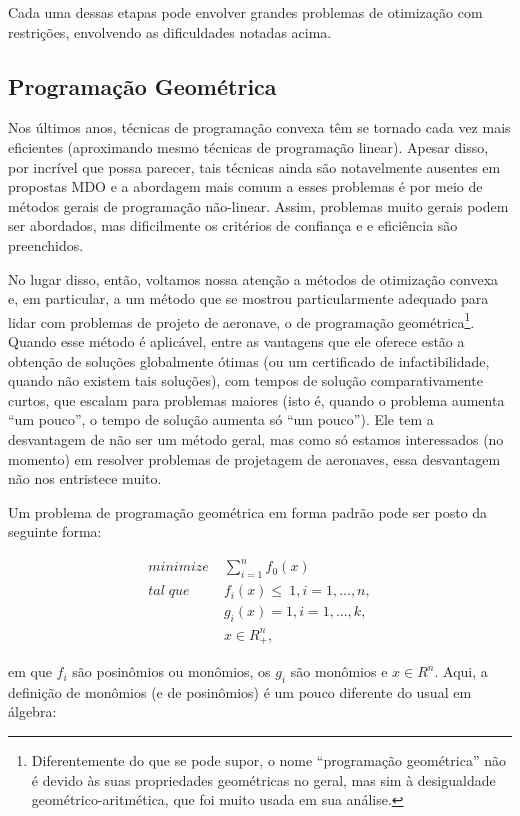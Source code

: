 \documentclass{article}
\begin{document}
Cada uma dessas etapas pode envolver grandes problemas de otimização
com restrições, envolvendo as dificuldades notadas acima.

\subsection{Programação Geométrica}

Nos últimos anos, técnicas de programação convexa têm se tornado cada
vez mais eficientes (aproximando mesmo técnicas de programação
linear).  Apesar disso, por incrível que possa parecer, tais técnicas
ainda são notavelmente ausentes em propostas MDO\cite{hoburg} e a
abordagem mais comum a esses problemas é por meio de métodos gerais de
programação não-linear. Assim, problemas muito gerais podem ser
abordados, mas dificilmente os critérios de confiança e e eficiência
são preenchidos.

No lugar disso, então, voltamos nossa atenção a métodos de otimização
convexa e, em particular, a um método que se mostrou particularmente
adequado para lidar com problemas de projeto de aeronave, o de
programação geométrica\footnote{Diferentemente do que se pode supor, o
  nome ``programação geométrica'' não é devido às suas propriedades
  geométricas no geral, mas sim à desigualdade geométrico-aritmética,
  que foi muito usada em sua análise.}. Quando esse método é
aplicável, entre as vantagens que ele oferece estão a obtenção de
soluções globalmente ótimas (ou um certificado de infactibilidade,
quando não existem tais soluções), com tempos de solução
comparativamente curtos, que escalam para problemas maiores (isto é,
quando o problema aumenta ``um pouco'', o tempo de solução aumenta só
``um pouco''). Ele tem a desvantagem de não ser um método geral, mas
como só estamos interessados (no momento) em resolver problemas de
projetagem de aeronaves, essa desvantagem não nos entristece muito.

Um problema de programação geométrica em forma padrão pode ser posto
da seguinte forma:

\begin{align*}
  minimize \;& \sum\limits_{i=1}^n f_0(x)\\ tal\; que\;& f_i(x) \leq\
  1, i = 1, ..., n,\\ & g_i(x) = 1, i = 1, ..., k,\\ & x \in R^n_{+},
\end{align*}

\noindent em que $f_i$ são posinômios ou monômios, os $g_i$ são
monômios e $x \in R^n$. Aqui, a definição de monômios (e de
posinômios) é um pouco diferente do usual em álgebra:
\end{document}

